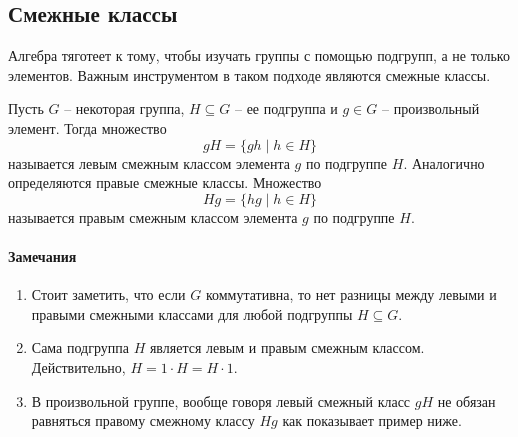 \subsection{Смежные классы}

Алгебра тяготеет к тому, чтобы изучать группы с помощью подгрупп, а не только элементов.
Важным инструментом в таком подходе являются смежные классы.

\begin{definition}
Пусть $G$ -- некоторая группа, $H\subseteq G$ -- ее подгруппа и $g\in G$ -- произвольный элемент.
Тогда множество
\[
gH = \{gh\mid h\in H\}
\]
называется левым смежным классом элемента $g$ по подгруппе $H$.
Аналогично определяются правые смежные классы.
Множество
\[
Hg = \{hg\mid h\in H\}
\]
называется правым смежным классом элемента $g$ по подгруппе $H$.
\end{definition}

\paragraph{Замечания}

\begin{enumerate}
\item Стоит заметить, что если $G$ коммутативна, то нет разницы между левыми и правыми смежными классами для любой подгруппы $H\subseteq G$.

\item Сама подгруппа $H$ является левым и правым смежным классом.
Действительно, $H = 1 \cdot H = H \cdot 1$.

\item В произвольной группе, вообще говоря левый смежный класс $gH$ не обязан равняться правому смежному классу $Hg$ как показывает пример ниже.
\end{enumerate}


